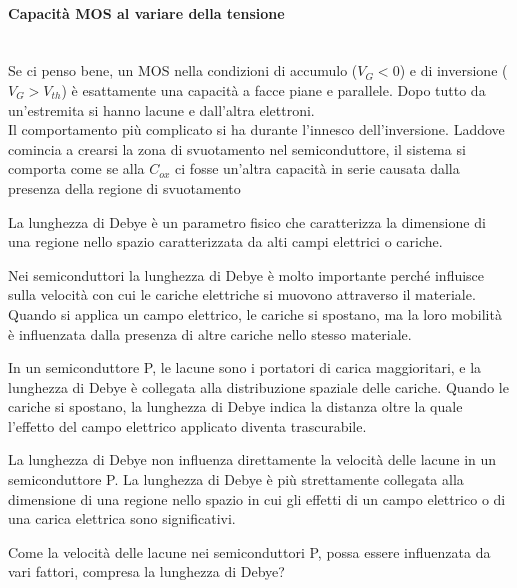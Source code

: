 \paragraph{Capacità MOS al variare della tensione}\mbox{}\\
Se ci penso bene, un MOS nella condizioni di accumulo ($V_G<0$) e di inversione ($V_G>V_{th}$) è esattamente una capacità a facce piane e parallele. Dopo tutto da un'estremita si hanno lacune e dall'altra elettroni.\\
Il comportamento più complicato si ha durante l'innesco dell'inversione. Laddove comincia a crearsi la zona di svuotamento nel semiconduttore, il sistema si comporta come se alla $C_{ox}$ ci fosse un'altra capacità  in serie causata dalla presenza della regione di svuotamento
\begin{ripasso}
    La lunghezza di Debye è un parametro fisico che caratterizza la dimensione di una regione nello spazio caratterizzata da alti campi elettrici o cariche.

Nei semiconduttori la lunghezza di Debye è molto importante perché influisce sulla velocità con cui le cariche elettriche si muovono attraverso il materiale. Quando si applica un campo elettrico, le cariche si spostano, ma la loro mobilità è influenzata dalla presenza di altre cariche nello stesso materiale.

In un semiconduttore P, le lacune sono i portatori di carica maggioritari, e la lunghezza di Debye è collegata alla distribuzione spaziale delle cariche. Quando le cariche si spostano, la lunghezza di Debye indica la distanza oltre la quale l'effetto del campo elettrico applicato diventa trascurabile. 

La lunghezza di Debye non influenza direttamente la velocità delle lacune in un semiconduttore P. La lunghezza di Debye è più strettamente collegata alla dimensione di una regione nello spazio in cui gli effetti di un campo elettrico o di una carica elettrica sono significativi.

Come la velocità delle lacune nei semiconduttori P, possa essere influenzata da vari fattori, compresa la lunghezza di Debye?


\end{ripasso}
